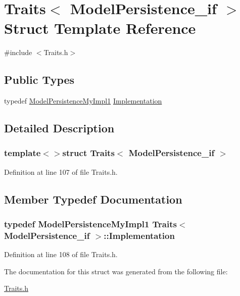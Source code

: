\hypertarget{struct_traits_3_01_model_persistence__if_01_4}{\section{Traits$<$ Model\-Persistence\-\_\-if $>$ Struct Template Reference}
\label{struct_traits_3_01_model_persistence__if_01_4}
}


{\ttfamily \#include $<$Traits.\-h$>$}

\subsection*{Public Types}
\begin{DoxyCompactItemize}
\item 
typedef \hyperlink{class_model_persistence_my_impl1}{Model\-Persistence\-My\-Impl1} \hyperlink{struct_traits_3_01_model_persistence__if_01_4_aab21a3f51580006b6926b0ee0e4d6302}{Implementation}
\end{DoxyCompactItemize}


\subsection{Detailed Description}
\subsubsection*{template$<$$>$struct Traits$<$ Model\-Persistence\-\_\-if $>$}



Definition at line 107 of file Traits.\-h.



\subsection{Member Typedef Documentation}
\hypertarget{struct_traits_3_01_model_persistence__if_01_4_aab21a3f51580006b6926b0ee0e4d6302}{
\subsubsection[{Implementation}]{\setlength{\rightskip}{0pt plus 5cm}typedef {\bf Model\-Persistence\-My\-Impl1} {\bf Traits}$<$ {\bf Model\-Persistence\-\_\-if} $>$\-::{\bf Implementation}}}\label{struct_traits_3_01_model_persistence__if_01_4_aab21a3f51580006b6926b0ee0e4d6302}


Definition at line 108 of file Traits.\-h.



The documentation for this struct was generated from the following file\-:\begin{DoxyCompactItemize}
\item 
\hyperlink{_traits_8h}{Traits.\-h}\end{DoxyCompactItemize}
